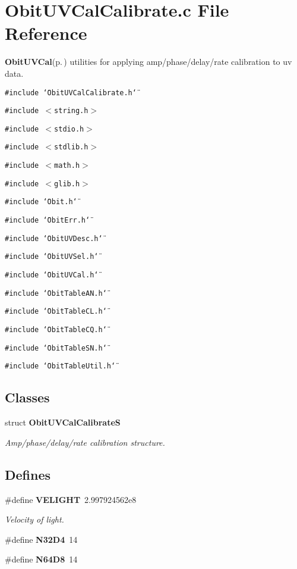 \section{Obit\-UVCal\-Calibrate.c File Reference}
\label{ObitUVCalCalibrate_8c}
{\bf Obit\-UVCal}{\rm (p.\,\pageref{structObitUVCal})} utilities for applying amp/phase/delay/rate calibration to uv data. 

{\tt \#include \char`\"{}Obit\-UVCal\-Calibrate.h\char`\"{}}\par
{\tt \#include $<$string.h$>$}\par
{\tt \#include $<$stdio.h$>$}\par
{\tt \#include $<$stdlib.h$>$}\par
{\tt \#include $<$math.h$>$}\par
{\tt \#include $<$glib.h$>$}\par
{\tt \#include \char`\"{}Obit.h\char`\"{}}\par
{\tt \#include \char`\"{}Obit\-Err.h\char`\"{}}\par
{\tt \#include \char`\"{}Obit\-UVDesc.h\char`\"{}}\par
{\tt \#include \char`\"{}Obit\-UVSel.h\char`\"{}}\par
{\tt \#include \char`\"{}Obit\-UVCal.h\char`\"{}}\par
{\tt \#include \char`\"{}Obit\-Table\-AN.h\char`\"{}}\par
{\tt \#include \char`\"{}Obit\-Table\-CL.h\char`\"{}}\par
{\tt \#include \char`\"{}Obit\-Table\-CQ.h\char`\"{}}\par
{\tt \#include \char`\"{}Obit\-Table\-SN.h\char`\"{}}\par
{\tt \#include \char`\"{}Obit\-Table\-Util.h\char`\"{}}\par
\subsection*{Classes}
\begin{CompactItemize}
\item 
struct {\bf Obit\-UVCal\-Calibrate\-S}
\begin{CompactList}\small\item\em Amp/phase/delay/rate calibration structure. \item\end{CompactList}\end{CompactItemize}
\subsection*{Defines}
\begin{CompactItemize}
\item 
\#define {\bf VELIGHT}\ 2.997924562e8
\begin{CompactList}\small\item\em Velocity of light. \item\end{CompactList}\item 
\#define {\bf N32D4}\ 14
\item 
\#define {\bf N64D8}\ 14
\end{CompactItemize}
